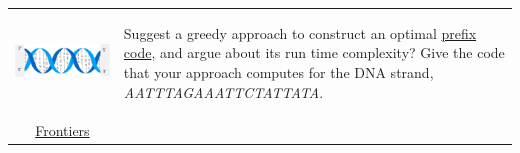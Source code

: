 \documentclass[addpoints]{exam}
\begin{document}
\begin{questions}
\begin{solution}
  \end{solution}

\question
  \begin{tabularx}{\textwidth}{cX}
    \includegraphics[height=75pt,align=t]{dna}
    &
    Suggest a greedy approach to construct an optimal \href{https://en.wikipedia.org/wiki/Prefix_code}{prefix code}, and argue about its run time complexity? Give the code that your approach computes for the DNA strand, \textit{AATTTAGAAATTCTATTATA}.\\
    \href{https://www.frontiersin.org/articles/10.3389/fbioe.2020.01032/full}{Frontiers}
  \end{tabularx}
  
  \begin{solution}
    
  \end{solution}

\end{questions}
\end{document}
